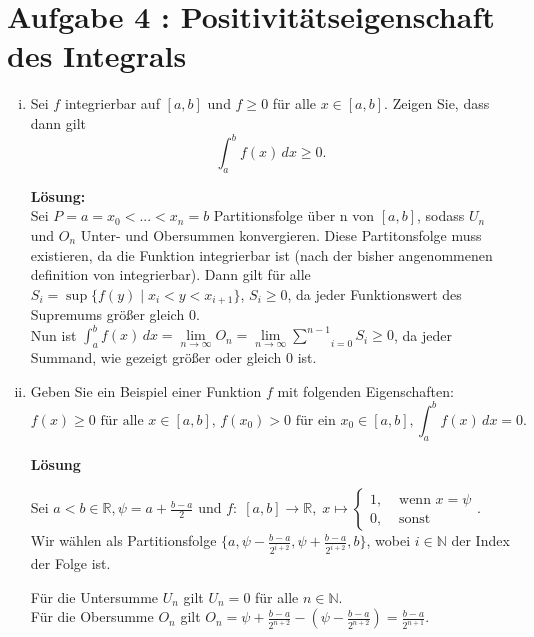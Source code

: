\documentclass[11pt,a4paper,ngerman]{article}
\begin{document}
\section*{Aufgabe 4 : \mdseries Positivitätseigenschaft des Integrals}

\begin{enumerate}[i)]
    \item Sei $f$ integrierbar auf $[a,b]$ und $f\geq 0$ für alle $x \in [a,b]$. Zeigen Sie, dass dann gilt
$$
    \int_{a}^{b} f(x) \, dx \geq 0.
$$

\textbf{Lösung:}\\

Sei $P=a=x_0<...<x_n=b$ Partitionsfolge über n von $[a,b]$, sodass $U_n$ und $O_n$ Unter- und Obersummen konvergieren. Diese Partitonsfolge muss existieren, da die Funktion integrierbar ist (nach der bisher angenommenen definition von integrierbar). Dann gilt für alle $S_i = \sup \{ f(y) \; | \; x_i < y < x_{i+1} \}$, $S_i \geq 0$, da jeder Funktionswert des Supremums größer gleich $0$.\\
 Nun ist $\int_a^b f(x) \, dx = \underset{n \rightarrow \infty}{\lim} O_n = \underset{n \rightarrow \infty}{\lim} \underset{i=0}{\overset{n-1}{\sum}} S_i \geq 0$, da jeder Summand, wie gezeigt größer oder gleich 0 ist.

    \item Geben Sie ein Beispiel einer Funktion $f$ mit folgenden Eigenschaften:
$$
    f(x) \geq 0 \text{ für alle } x\in [a,b], \, f(x_0) > 0\text { für ein } x_0 \in [a,b], \int_{a}^{b} f(x) \, dx = 0.
$$

\textbf{Lösung}

Sei $a < b \in \mathbb{R}, \psi = a + \frac{b-a}{2}$ und $f:\; [a,b] \to \mathbb{R},\; x \mapsto \begin{cases}  
                                                    1, &\text{ wenn } x = \psi\\
                                                    0, &\text{ sonst}
                                                 \end{cases}$.\\

Wir wählen als Partitionsfolge $\{a,\psi - \frac{b-a}{2^{i+2}},\psi + \frac{b-a}{2^{i+2}},b\}$, wobei $i \in \mathbb{N}$ der Index der Folge ist.

Für die Untersumme $U_n$ gilt $U_n = 0$ für alle $n \in \mathbb{N}$. \\
Für die Obersumme $O_n$ gilt $O_n = \psi + \frac{b-a}{2^{n+2}} - \left(\psi - \frac{b-a}{2^{n+2}}\right)
 = \frac{b-a}{2^{n+1}}$. \\


\end{enumerate}
\end{document}
